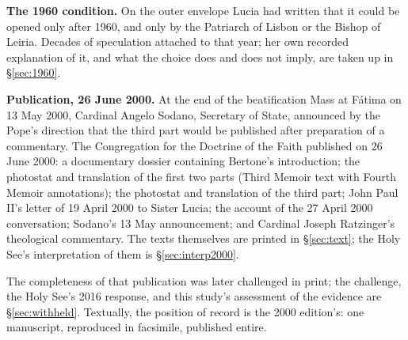 \textbf{The 1960 condition.} On the outer envelope Lucia had written
that it could be opened only after 1960, and only by the Patriarch of
Lisbon or the Bishop of Leiria. Decades of speculation attached to
that year; her own recorded explanation of it, and what the choice
does and does not imply, are taken up in \S\ref{sec:1960}.

\textbf{Publication, 26 June 2000.} At the end of the beatification
Mass at F\'atima on 13 May 2000, Cardinal Angelo Sodano, Secretary of
State, announced by the Pope's direction that the third part would be
published after preparation of a commentary. The Congregation for the
Doctrine of the Faith published  on
26 June 2000: a documentary dossier containing Bertone's
introduction; the photostat and translation of the first two parts
(Third Memoir text with Fourth Memoir annotations); the photostat and
translation of the third part; John Paul II's letter of 19 April 2000
to Sister Lucia; the account of the 27 April 2000 conversation;
Sodano's 13 May announcement; and Cardinal Joseph Ratzinger's
theological commentary. The texts themselves are printed in
\S\ref{sec:text}; the Holy See's interpretation of them is
\S\ref{sec:interp2000}.

The completeness of that publication was later challenged in print;
the challenge, the Holy See's 2016 response, and this study's
assessment of the evidence are \S\ref{sec:withheld}. Textually, the
position of record is the 2000 edition's: one manuscript, reproduced
in facsimile, published entire.
